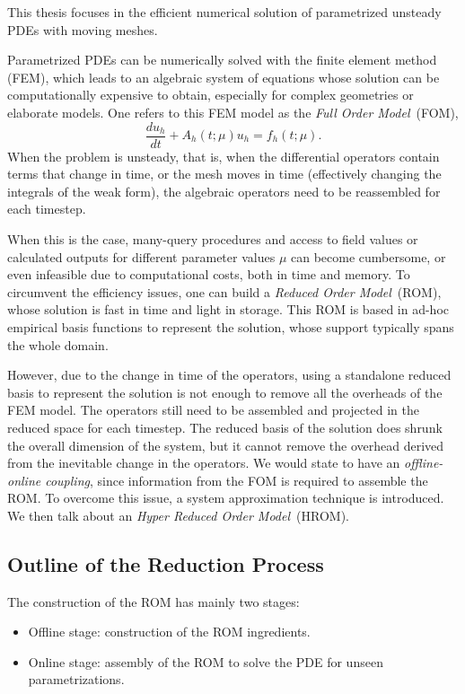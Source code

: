 This thesis focuses in the efficient numerical solution of parametrized unsteady PDEs with moving meshes.

Parametrized PDEs can be numerically solved with the finite element method (FEM), 
which leads to an algebraic system of equations whose solution 
can be computationally expensive to obtain, 
especially for complex geometries or elaborate models.
One refers to this FEM model as the \textit{Full Order Model}~(FOM),
\begin{equation}
   \frac{du_h}{dt} + A_h\left(t;\mu\right) u_h = f_h\left(t;\mu\right).
\end{equation}
When the problem is unsteady, that is, 
when the differential operators contain terms that change in time,
or the mesh moves in time (effectively changing the integrals of the weak form),
the algebraic operators need to be reassembled for each timestep.

When this is the case, many-query procedures and access to field values or 
calculated outputs for different parameter values $\mu$ can become cumbersome, 
or even infeasible due to computational costs, both in time and memory.
To circumvent the efficiency issues, one can build a \textit{Reduced Order Model}~(ROM), 
whose solution is fast in time and light in storage.
This ROM is based in ad-hoc empirical basis functions to represent the solution, 
whose support typically spans the whole domain. 

However, due to the change in time of the operators, 
using a standalone reduced basis to represent the solution
is not enough to remove all the overheads of the FEM model.
The operators still need to be assembled 
and projected in the reduced space for each timestep.
The reduced basis of the solution does shrunk the overall dimension of the system,
but it cannot remove the overhead derived from the inevitable change in the operators.
We would state to have an \textit{offline-online coupling},
since information from the FOM is required to assemble the ROM.
To overcome this issue, a system approximation technique is introduced.
We then talk about an \textit{Hyper Reduced Order Model}~(HROM).

\subsection{Outline of the Reduction Process}
The construction of the ROM has mainly two stages:
\begin{itemize}
   \item Offline stage: construction of the ROM ingredients.
   \item Online stage: assembly of the ROM to solve the PDE for unseen parametrizations.
\end{itemize}


